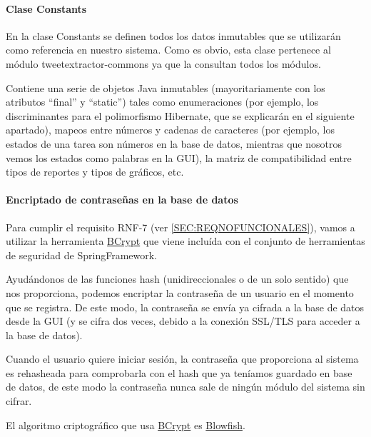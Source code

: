 \paragraph{Clase Constants}
En la clase Constants se definen todos los datos inmutables que se utilizarán como referencia en nuestro sistema. Como es obvio, esta clase pertenece al módulo tweetextractor-commons ya que la consultan todos los módulos.

Contiene una serie de objetos Java inmutables (mayoritariamente con los atributos ``final'' y ``static'') tales como enumeraciones (por ejemplo, los discriminantes para el polimorfismo Hibernate, que se explicarán en el siguiente apartado), mapeos entre números y cadenas de caracteres (por ejemplo, los estados de una tarea son números en la base de datos, mientras que nosotros vemos los estados como palabras en la GUI), la matriz de compatibilidad entre tipos de reportes y tipos de gráficos, etc.

\paragraph{Encriptado de contraseñas en la base de datos}
Para cumplir el requisito RNF-7 (ver \ref{SEC:REQNOFUNCIONALES}), vamos a utilizar la herramienta \href{https://docs.spring.io/spring-security/site/docs/current/api/org/springframework/security/crypto/bcrypt/BCrypt.html}{BCrypt} que viene incluída con el conjunto de herramientas de seguridad de SpringFramework. 

Ayudándonos de las funciones hash (unidireccionales o de un solo sentido) que nos proporciona, podemos encriptar la contraseña de un usuario en el momento que se registra. De este modo, la contraseña se envía ya cifrada a la base de datos desde la GUI (y se cifra dos veces, debido a la conexión SSL/TLS para acceder a la base de datos). 

Cuando el usuario quiere iniciar sesión, la contraseña que proporciona al sistema es rehasheada para comprobarla con el hash que ya teníamos guardado en base de datos, de este modo la contraseña nunca sale de ningún módulo del sistema sin cifrar.

El algoritmo criptográfico que usa \href{https://docs.spring.io/spring-security/site/docs/current/api/org/springframework/security/crypto/bcrypt/BCrypt.html}{BCrypt} es \href{https://en.wikipedia.org/wiki/Blowfish_(cipher)}{Blowfish}. 

